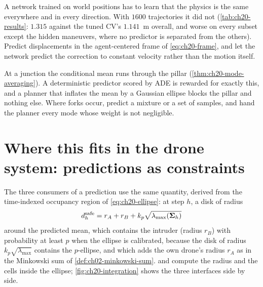 \begin{pitfall}
A network trained on world positions has to learn that the physics is the
same everywhere and in every direction. With $1600$ trajectories it did not
(\cref{tab:ch20-results}: $1.315$ against the tuned CV's $1.141$~m overall,
and worse on every subset except the hidden maneuvers, where no predictor is
separated from the others). Predict
displacements in the agent-centered frame of \cref{eq:ch20-frame}, and let the
network predict the correction to constant velocity rather than the motion
itself.
\end{pitfall}

\begin{pitfall}
At a junction the conditional mean runs through the pillar
(\cref{thm:ch20-mode-averaging}). A deterministic predictor scored by ADE is
rewarded for exactly this, and a planner that inflates the mean by a
Gaussian ellipse blocks the pillar and nothing else. Where forks occur,
predict a mixture or a set of samples, and hand the planner every mode whose
weight is not negligible.
\end{pitfall}

\section[Where this fits in the drone system]{Where this fits in the drone system: predictions as constraints}
\label{sec:ch20-drone}

The three consumers of a prediction use the same quantity, derived from the
time-indexed occupancy region of \cref{eq:ch20-ellipse}: at step $h$, a disk
of radius
\begin{equation}
  d^{\mathrm{safe}}_h = r_A + r_B + k_p\sqrt{\lambda_{\max}(\mathbf{\Sigma}_h)}
  \label{eq:ch20-inflated}
\end{equation}
around the predicted mean, which contains the intruder (radius $r_B$) with
probability at least $p$ when the ellipse is calibrated, because the disk of
radius $k_p\sqrt{\lambda_{\max}}$ contains the $p$-ellipse, and which adds the
own drone's radius $r_A$ as in the Minkowski sum of
\cref{def:ch02-minkowski-sum}.  and
 compute the radius and the cells inside the ellipse;
\cref{fig:ch20-integration} shows the three interfaces side by side.

